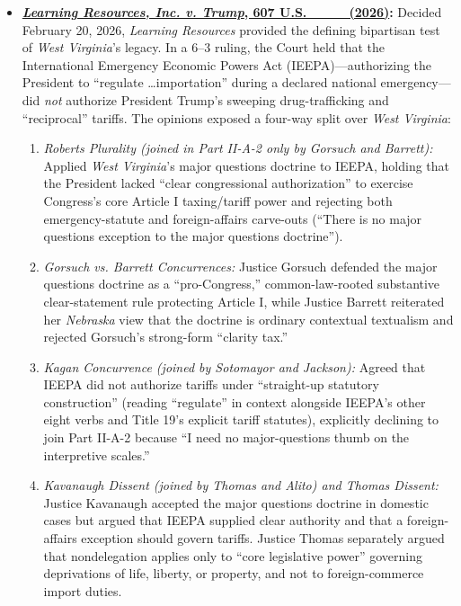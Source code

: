 \documentclass[12pt]{article}
\begin{document}
\begin{itemize}
\item \textbf{\href{https://supreme.justia.com/cases/federal/us/607/24-1287/}{\textit{Learning Resources, Inc. v. Trump}, 607 U.S. \_\_\_ (2026)}:} Decided February 20, 2026, \textit{Learning Resources} provided the defining bipartisan test of \textit{West Virginia}'s legacy. In a 6--3 ruling, the Court held that the International Emergency Economic Powers Act (IEEPA)---authorizing the President to ``regulate \dots importation'' during a declared national emergency---did \textit{not} authorize President Trump's sweeping drug-trafficking and ``reciprocal'' tariffs. The opinions exposed a four-way split over \textit{West Virginia}:
    \begin{enumerate}
      \item \textit{Roberts Plurality (joined in Part II-A-2 only by Gorsuch and Barrett):} Applied \textit{West Virginia}'s major questions doctrine to IEEPA, holding that the President lacked ``clear congressional authorization'' to exercise Congress's core Article I taxing/tariff power and rejecting both emergency-statute and foreign-affairs carve-outs (``There is no major questions exception to the major questions doctrine'').
      \item \textit{Gorsuch vs. Barrett Concurrences:} Justice Gorsuch defended the major questions doctrine as a ``pro-Congress,'' common-law-rooted substantive clear-statement rule protecting Article I, while Justice Barrett reiterated her \textit{Nebraska} view that the doctrine is ordinary contextual textualism and rejected Gorsuch's strong-form ``clarity tax.''
      \item \textit{Kagan Concurrence (joined by Sotomayor and Jackson):} Agreed that IEEPA did not authorize tariffs under ``straight-up statutory construction'' (reading ``regulate'' in context alongside IEEPA's other eight verbs and Title 19's explicit tariff statutes), explicitly declining to join Part II-A-2 because ``I need no major-questions thumb on the interpretive scales.''
      \item \textit{Kavanaugh Dissent (joined by Thomas and Alito) and Thomas Dissent:} Justice Kavanaugh accepted the major questions doctrine in domestic cases but argued that IEEPA supplied clear authority and that a foreign-affairs exception should govern tariffs. Justice Thomas separately argued that nondelegation applies only to ``core legislative power'' governing deprivations of life, liberty, or property, and not to foreign-commerce import duties.
    \end{enumerate}
\end{itemize}
\end{document}
